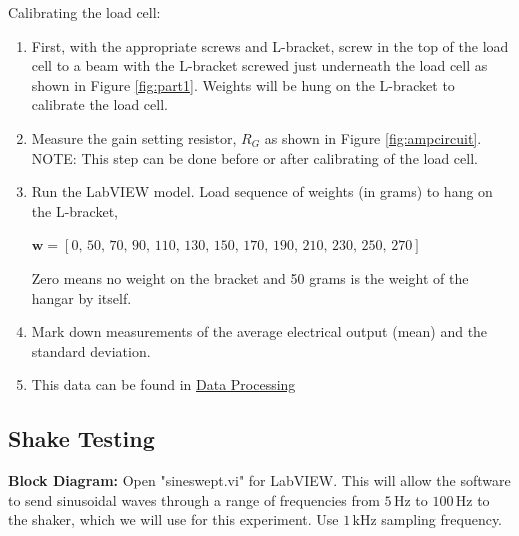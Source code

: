 \documentclass{article}
\begin{document}
Calibrating the load cell:

\begin{enumerate}
    \item First, with the appropriate screws and L-bracket, screw in the top of the load cell to a beam with the L-bracket screwed just underneath the load cell as shown in Figure \ref{fig:part1}. Weights will be hung on the L-bracket to calibrate the load cell.
    \item Measure the gain setting resistor, $R_{G}$ as shown in Figure \ref{fig:ampcircuit}.\\
    NOTE: This step can be done before or after calibrating of the load cell.
    \item Run the LabVIEW model. Load sequence of weights (in grams) to hang on the L-bracket,
    \begin{center}
    $\textbf{w} = \left[0,\, 50,\, 70,\, 90,\, 110,\, 130,\, 150,\, 170,\, 190,\, 210,\, 230,\, 250,\, 270\right]$
    \end{center}
    Zero means no weight on the bracket and 50 grams is the weight of the hangar by itself. 
    \item Mark down measurements of the average electrical output (mean) and the standard deviation.
    \item This data can be found in \hyperlink{datapro}{Data Processing}
\end{enumerate}

\subsection{Shake Testing}
\textbf{Block Diagram:} Open "sineswept.vi" for LabVIEW. This will allow the software to send sinusoidal waves through a range of frequencies from $5\, \text{Hz}$ to $100\, \text{Hz}$ to the shaker, which we will use for this experiment. Use $1\, \text{kHz}$ sampling frequency.
\vspace{5mm}
\end{document}
